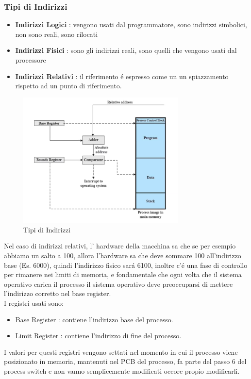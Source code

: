     \subsubsection*{Tipi di Indirizzi}
    \begin{itemize}
        \item \textbf{Indirizzi Logici} : vengono usati dal programmatore, sono indirizzi simbolici, non sono reali, sono rilocati
        \item \textbf{Indirizzi Fisici} : sono gli indirizzi reali, sono quelli che vengono usati dal processore
        \item \textbf{Indirizzi Relativi} : il riferimento é espresso come un un spiazzamento rispetto ad un punto di riferimento.
    \end{itemize}
    \begin{figure}[H]
        \centering
        \includegraphics[width=0.75\textwidth]{immagini/RilocazioneConHardware}
        \caption{Tipi di Indirizzi}
    \end{figure}
    Nel caso di indirizzi relativi, l' hardware della macchina sa che se per esempio abbiamo un salto a 100, allora
    l'hardware sa che deve sommare 100 all'indirizzo base (Es. 6000), quindi l'indirizzo fisico sará 6100, inoltre c'é una
    fase di controllo per rimanere nei limiti di memoria, e fondamentale che ogni volta che il sistema operativo carica il
    processo il sistema operativo deve preoccuparsi di mettere l'indirizzo corretto nel base register.\\

    I registri usati sono:
    \begin{itemize}
        \item Base Register : contiene l'indirizzo base del processo.
        \item Limit Register : contiene l'indirizzo di fine del processo.
    \end{itemize}
    I valori per questi registri vengono settati nel momento in cui il processo viene posizionato in memoria, mantenuti nel PCB del processo,
    fa parte del passo 6 del process switch e non vanno semplicemente modificati occore propio modificarli.
